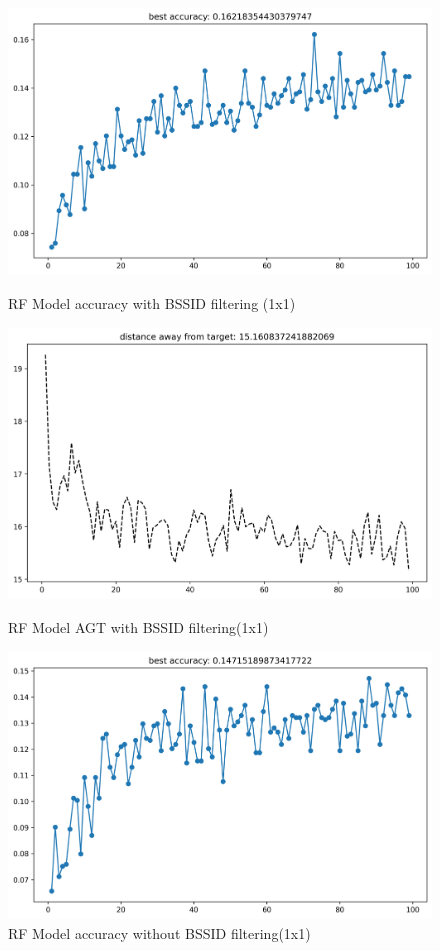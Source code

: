 \documentclass[conference]{IEEEtran}
\begin{document}
	
	\begin{figure}[hbt!]
		\centering
		\begin{minipage}{0.45\textwidth}
			\centering
			\includegraphics[width=\linewidth]{image5.png}
			\caption{RF Model accuracy with BSSID filtering (1x1)} 	
			\label{fig:rf_acc_filter}
				
			\includegraphics[width=\linewidth]{image4.png}
			\caption{RF Model AGT with BSSID filtering(1x1)}
			\label{fig:rf_agt_filter}
		\end{minipage}
		\hfill
		\begin{minipage}{0.45\textwidth}
			\centering
			\includegraphics[width=\linewidth]{image6.png}
			\caption{RF Model accuracy without BSSID filtering(1x1)}
			\label{fig:rf_acc_nofilter}
			

\end{minipage}
\end{figure}
\end{document}
